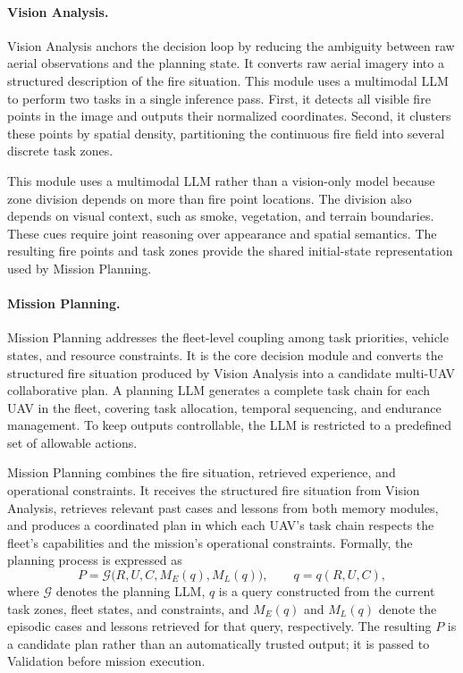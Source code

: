 \paragraph{Vision Analysis.} Vision Analysis anchors the decision loop by
reducing the ambiguity between raw aerial observations and the planning state.
It converts raw aerial imagery into a structured description of the fire
situation.
This module uses a multimodal LLM to perform two tasks in a single inference pass.
First, it detects all visible fire points in the image and outputs their normalized coordinates.
Second, it clusters these points by spatial density, partitioning the continuous fire field
into several discrete task zones.

This module uses a multimodal LLM rather than a vision-only model because zone division
depends on more than fire point locations.
The division also depends on visual context, such as smoke, vegetation,
and terrain boundaries.
These cues require joint reasoning over appearance and spatial semantics.
The resulting fire points and task zones provide the shared initial-state
representation used by Mission Planning.

\paragraph{Mission Planning.} Mission Planning addresses the fleet-level
coupling among task priorities, vehicle states, and resource constraints. It is
the core decision module and converts the structured fire situation produced by
Vision Analysis into a candidate multi-UAV collaborative plan. A planning LLM
generates a complete task chain for each UAV in the fleet, covering task
allocation, temporal sequencing, and endurance management. To keep outputs
controllable, the LLM is restricted to a predefined set of allowable actions.

Mission Planning combines the fire situation, retrieved experience,
and operational constraints.
It receives the structured fire situation from Vision Analysis,
retrieves relevant past cases and lessons from both memory modules,
and produces a coordinated plan in which each UAV's task chain respects
the fleet's capabilities and the mission's operational constraints.
Formally, the planning process is expressed as
\begin{equation}
P=\mathcal{G}\bigl(R,U,C,M_E(q),M_L(q)\bigr),
\qquad q=q(R,U,C),
\label{eq:memory-augmented-planning}
\end{equation}
where $\mathcal{G}$ denotes the planning LLM, $q$ is a query constructed from
the current task zones, fleet states, and constraints, and $M_E(q)$ and $M_L(q)$
denote the episodic cases and lessons retrieved for that query, respectively.
The resulting $P$ is a candidate plan rather than an automatically trusted
output; it is passed to Validation before mission execution.

